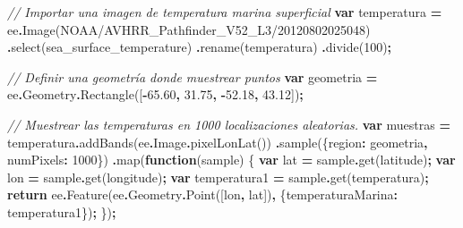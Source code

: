\documentclass[
  12pt,
  letterpaper,
  twoside]{book}
\newenvironment{Shaded}{\begin{snugshade}}{\end{snugshade}}
\newcommand{\AttributeTok}[1]{\textcolor[rgb]{0.77,0.63,0.00}{#1}}
\newcommand{\CommentTok}[1]{\textcolor[rgb]{0.56,0.35,0.01}{\textit{#1}}}
\newcommand{\ControlFlowTok}[1]{\textcolor[rgb]{0.13,0.29,0.53}{\textbf{#1}}}
\newcommand{\DataTypeTok}[1]{\textcolor[rgb]{0.13,0.29,0.53}{#1}}
\newcommand{\DecValTok}[1]{\textcolor[rgb]{0.00,0.00,0.81}{#1}}
\newcommand{\FloatTok}[1]{\textcolor[rgb]{0.00,0.00,0.81}{#1}}
\newcommand{\FunctionTok}[1]{\textcolor[rgb]{0.00,0.00,0.00}{#1}}
\newcommand{\KeywordTok}[1]{\textcolor[rgb]{0.13,0.29,0.53}{\textbf{#1}}}
\newcommand{\NormalTok}[1]{#1}
\newcommand{\OperatorTok}[1]{\textcolor[rgb]{0.81,0.36,0.00}{\textbf{#1}}}
\newcommand{\StringTok}[1]{\textcolor[rgb]{0.31,0.60,0.02}{#1}}
\begin{document}
\begin{Shaded}
\begin{Highlighting}[]
\CommentTok{// Importar una imagen de temperatura marina superficial}
\KeywordTok{var}\NormalTok{ temperatura }\OperatorTok{=}\NormalTok{ ee}\OperatorTok{.}\FunctionTok{Image}\NormalTok{(}\StringTok{\textquotesingle{}NOAA/AVHRR\_Pathfinder\_V52\_L3/20120802025048\textquotesingle{}}\NormalTok{)}
  \OperatorTok{.}\FunctionTok{select}\NormalTok{(}\StringTok{\textquotesingle{}sea\_surface\_temperature\textquotesingle{}}\NormalTok{)}
  \OperatorTok{.}\FunctionTok{rename}\NormalTok{(}\StringTok{\textquotesingle{}temperatura\textquotesingle{}}\NormalTok{)}
  \OperatorTok{.}\FunctionTok{divide}\NormalTok{(}\DecValTok{100}\NormalTok{)}\OperatorTok{;}

\CommentTok{// Definir una geometría donde muestrear puntos}
\KeywordTok{var}\NormalTok{ geometria }\OperatorTok{=}\NormalTok{ ee}\OperatorTok{.}\AttributeTok{Geometry}\OperatorTok{.}\FunctionTok{Rectangle}\NormalTok{([}\OperatorTok{{-}}\FloatTok{65.60}\OperatorTok{,} \FloatTok{31.75}\OperatorTok{,} \OperatorTok{{-}}\FloatTok{52.18}\OperatorTok{,} \FloatTok{43.12}\NormalTok{])}\OperatorTok{;}

\CommentTok{// Muestrear las temperaturas en 1000 localizaciones aleatorias.}
\KeywordTok{var}\NormalTok{ muestras }\OperatorTok{=}\NormalTok{ temperatura}\OperatorTok{.}\FunctionTok{addBands}\NormalTok{(ee}\OperatorTok{.}\AttributeTok{Image}\OperatorTok{.}\FunctionTok{pixelLonLat}\NormalTok{())}
  \OperatorTok{.}\FunctionTok{sample}\NormalTok{(\{}\DataTypeTok{region}\OperatorTok{:}\NormalTok{ geometria}\OperatorTok{,} \DataTypeTok{numPixels}\OperatorTok{:} \DecValTok{1000}\NormalTok{\})}
  \OperatorTok{.}\FunctionTok{map}\NormalTok{(}\KeywordTok{function}\NormalTok{(sample) \{}
    \KeywordTok{var}\NormalTok{ lat }\OperatorTok{=}\NormalTok{ sample}\OperatorTok{.}\FunctionTok{get}\NormalTok{(}\StringTok{\textquotesingle{}latitude\textquotesingle{}}\NormalTok{)}\OperatorTok{;}
    \KeywordTok{var}\NormalTok{ lon }\OperatorTok{=}\NormalTok{ sample}\OperatorTok{.}\FunctionTok{get}\NormalTok{(}\StringTok{\textquotesingle{}longitude\textquotesingle{}}\NormalTok{)}\OperatorTok{;}
    \KeywordTok{var}\NormalTok{ temperatura1 }\OperatorTok{=}\NormalTok{ sample}\OperatorTok{.}\FunctionTok{get}\NormalTok{(}\StringTok{\textquotesingle{}temperatura\textquotesingle{}}\NormalTok{)}\OperatorTok{;}
    \ControlFlowTok{return}\NormalTok{ ee}\OperatorTok{.}\FunctionTok{Feature}\NormalTok{(ee}\OperatorTok{.}\AttributeTok{Geometry}\OperatorTok{.}\FunctionTok{Point}\NormalTok{([lon}\OperatorTok{,}\NormalTok{ lat])}\OperatorTok{,} 
\NormalTok{    \{}\DataTypeTok{temperaturaMarina}\OperatorTok{:}\NormalTok{ temperatura1\})}\OperatorTok{;}
\NormalTok{  \})}\OperatorTok{;}


\end{Highlighting}
\end{Shaded}
\end{document}
